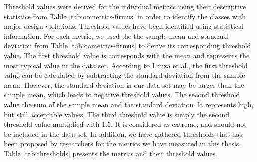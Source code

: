 Threshold values were derived for the individual metrics using their descriptive statistics from Table \ref{tab:oometrics-firmus} in order to identify the classes with major design violations. Threshold values have been identified using statistical information\cite{lanza2007object}. For each metric, we used the the sample mean and standard deviation from Table \ref{tab:oometrics-firmus} to derive its corresponding threshold value. The first threshold value is corresponds with the mean and represents the most typical value in the data set\cite{cais2014identifying}. According to Lanza et al.\cite{lanza2007object}, the first threshold value can be calculated by subtracting the standard deviation from the sample mean. However, the standard deviation in our data set may be larger than the sample mean, which leads to negative threshold values. The second threshold value the sum of the sample mean and the standard deviation. It represents high, but still acceptable values. The third threshold value is simply the second threshold value multiplied with 1.5\cite{lanza2007object}. It is considered as extreme, and should not be included in the data set. In addition, we have gathered thresholds that has been proposed by researchers for the metrics we have measured in this thesis. Table \ref{tab:thresholds} presents the metrics and their threshold values.

